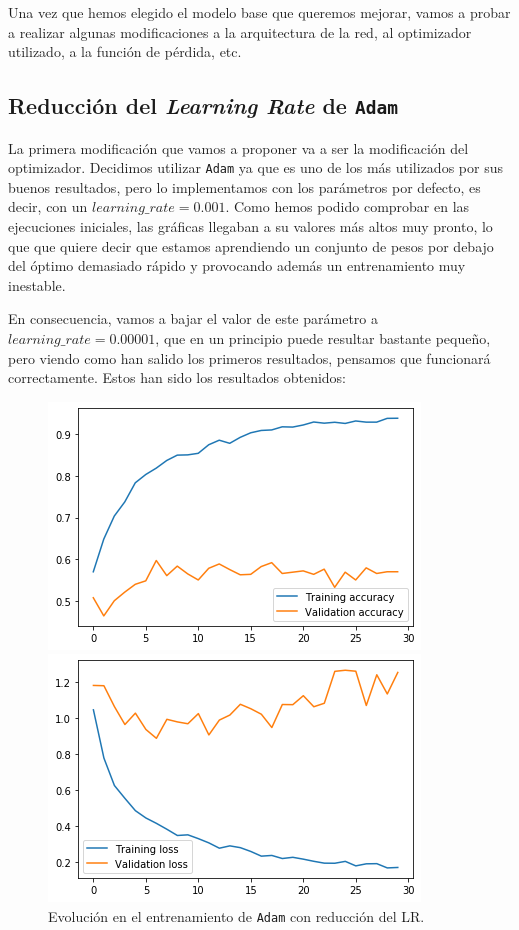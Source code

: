 \documentclass[11pt,a4paper]{article}
\begin{document}
Una vez que hemos elegido el modelo base que queremos mejorar, vamos a probar a realizar algunas modificaciones
a la arquitectura de la red, al optimizador utilizado, a la función de pérdida, etc.

\subsection{Reducción del \textit{Learning Rate} de \texttt{Adam}}

La primera modificación que vamos a proponer va a ser la modificación del optimizador. Decidimos utilizar \texttt{Adam}
ya que es uno de los más utilizados por sus buenos resultados, pero lo implementamos con los parámetros por defecto, es
decir, con un $learning\_rate=0.001$. Como hemos podido comprobar en las ejecuciones iniciales, las gráficas llegaban a
su valores más altos muy pronto, lo que que quiere decir que estamos aprendiendo un conjunto de pesos por debajo del
óptimo demasiado rápido y provocando además un entrenamiento muy inestable.

En consecuencia, vamos a bajar el valor de este parámetro a $learning\_rate=0.00001$, que en un principio puede resultar
bastante pequeño, pero viendo como han salido los primeros resultados, pensamos que funcionará correctamente. Estos han
sido los resultados obtenidos:

\begin{figure}[H]
\centering
\begin{minipage}{0.5\textwidth}
  \centering
  \includegraphics[scale=0.5]{img/accuracy-adam.png}
\end{minipage}%
\begin{minipage}{0.5\textwidth}
  \centering
  \includegraphics[scale=0.5]{img/loss-adam.png}
\end{minipage}
\caption{Evolución en el entrenamiento de \texttt{Adam} con reducción del LR.}
\label{fig:graph-adam}
\end{figure}
\end{document}
